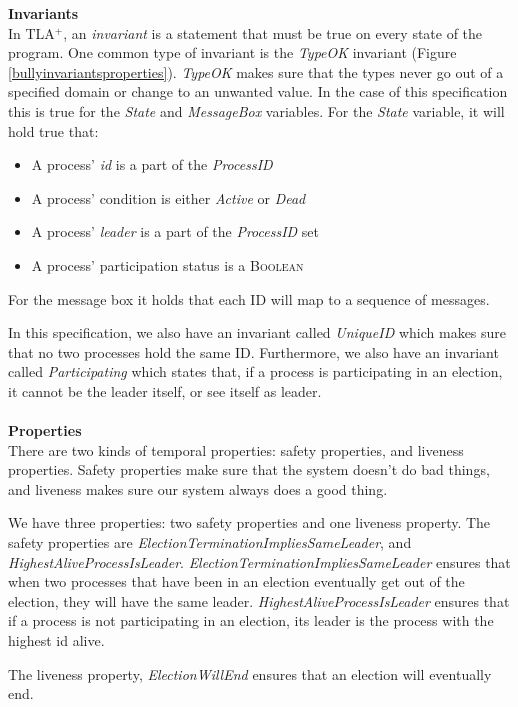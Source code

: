 \documentclass{report}
\begin{document}
\textbf{Invariants}\\
\noindent
In TLA$^{+}$, an \textit{invariant} is a statement that must be true on every state of the program. One common type of invariant is the \textit{TypeOK} invariant (Figure \ref{bullyinvariantsproperties}). \textit{TypeOK} makes sure that the types never go out of a specified domain or change to an unwanted value. In the case of this specification this is true for the \textit{State} and \textit{MessageBox} variables. For the \textit{State} variable, it will hold true that:
\begin{itemize}
  \item A process' \textit{id} is a part of the \textit{ProcessID}
  \item A process' condition is either \textit{Active} or \textit{Dead}
  \item A process' \textit{leader} is a part of the \textit{ProcessID} set
  \item A process' participation status is a \textsc{Boolean}
\end{itemize}
For the message box it holds that each ID will map to a sequence of messages.

In this specification, we also have an invariant called \textit{UniqueID} which makes sure that no two processes hold the same ID. Furthermore, we also have an invariant called \textit{Participating} which states that, if a process is participating in an election, it cannot be the leader itself, or see itself as leader.
\\\\
\noindent
\textbf{Properties}\\
\noindent
There are two kinds of temporal properties: safety properties, and liveness properties. Safety properties make sure that the system doesn't do bad things, and liveness makes sure our system always does a good thing.

We have three properties: two safety properties and one liveness property. The safety properties are \textit{ElectionTerminationImpliesSameLeader}, and \textit{HighestAliveProcessIsLeader}. \textit{ElectionTerminationImpliesSameLeader} ensures that when two processes that have been in an election eventually get out of the election, they will have the same leader. \textit{HighestAliveProcessIsLeader} ensures that if a process is not participating in an election, its leader is the process with the highest id alive.

The liveness property, \textit{ElectionWillEnd} ensures that an election will eventually end.
\end{document}
